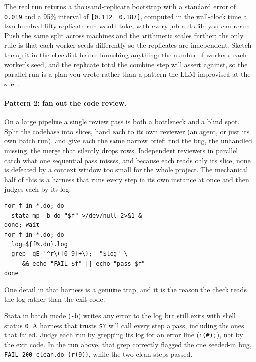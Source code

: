\documentclass[
    a4paper,
    fontsize=10pt,
    twoside=true,
    numbers=noenddot,
]{kaobook}
\newenvironment{vizcallout}[1][Visualization to build]{%
    \begin{vizbox}[frametitle={#1}]%
}{%
    \end{vizbox}%
}
\begin{document}
The real run returns a thousand-replicate bootstrap with a standard error of \texttt{0.019} and a 95\% interval of \texttt{[0.112, 0.187]}, computed in the wall-clock time a two-hundred-fifty-replicate run would take, with every job a do-file you can rerun. Push the same split across machines and the arithmetic scales further; the only rule is that each worker seeds differently so the replicates are independent. Sketch the split in the checklist before launching anything: the number of workers, each worker's seed, and the replicate total the combine step will assert against, so the parallel run is a plan you wrote rather than a pattern the LLM improvised at the shell.

\paragraph{Pattern 2: fan out the code review.} On a large pipeline a single review pass is both a bottleneck and a blind spot. Split the codebase into slices, hand each to its own reviewer (an agent, or just its own batch run), and give each the same narrow brief: find the bug, the unhandled missing, the merge that silently drops rows. Independent reviewers in parallel catch what one sequential pass misses, and because each reads only its slice, none is defeated by a context window too small for the whole project. The mechanical half of this is a harness that runs every step in its own instance at once and then judges each by its log:
\par
{\footnotesize
\begin{verbatim}
for f in *.do; do
  stata-mp -b do "$f" >/dev/null 2>&1 &
done; wait
for f in *.do; do
  log=${f%.do}.log
  grep -qE '^r\([0-9]+\);' "$log" \
     && echo "FAIL $f" || echo "pass $f"
done
\end{verbatim}
}
One detail in that harness is a genuine trap, and it is the reason the check reads the log rather than the exit code.

\begin{vizcallout}[The batch-exit-code trap]
Stata in batch mode (\texttt{-b}) writes any error to the log but still exits with shell status \texttt{0}. A harness that trusts \texttt{\$?} will call every step a pass, including the ones that failed. Judge each run by grepping its log for an error line (\texttt{r(\#);}), not by the exit code. In the run above, that grep correctly flagged the one seeded-in bug, \texttt{FAIL 200\_clean.do (r(9))}, while the two clean steps passed.
\end{vizcallout}
\end{document}
